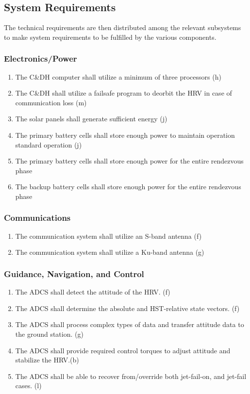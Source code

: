 \documentclass[paper=letter, fontsize=11pt]{scrartcl} %
\numberwithin{equation}{section} %
\numberwithin{figure}{section} %
\numberwithin{table}{section} %
\begin{document}
\subsection{System Requirements}
The technical requirements are then distributed among the relevant subsystems to make system requirements to be fulfilled by the various components.

\subsubsection{Electronics/Power}
\begin{enumerate}
    \item The C\&DH computer shall utilize a minimum of three processors (h)
    \item The C\&DH shall utilize a failsafe program to deorbit the HRV in case of communication loss (m)
    \item The solar panels shall generate sufficient energy (j)
    \item The primary battery cells shall store enough power to maintain operation standard operation (j)
    \item The primary battery cells shall store enough power for the entire rendezvous phase
    \item The backup battery cells shall store enough power for the entire rendezvous phase
\end{enumerate}

\subsubsection{Communications}
\begin{enumerate}
    \item The communication system shall utilize an S-band antenna (f)
    \item The communication system shall utilize a Ku-band antenna (g)
\end{enumerate}

\subsubsection{Guidance, Navigation, and Control}
\begin{enumerate}
    \item The ADCS shall detect the attitude of the HRV. (f)
    \item The ADCS shall determine the absolute and HST-relative state vectors. (f)
    \item The ADCS shall process complex types of data and transfer attitude data to the ground station. (g)
    \item The ADCS shall provide required control torques to adjust attitude and stabilize the HRV.(b)
    \item The ADCS shall be able to recover from/override both jet-fail-on, and jet-fail cases. (l)
\end{enumerate}
\end{document}
